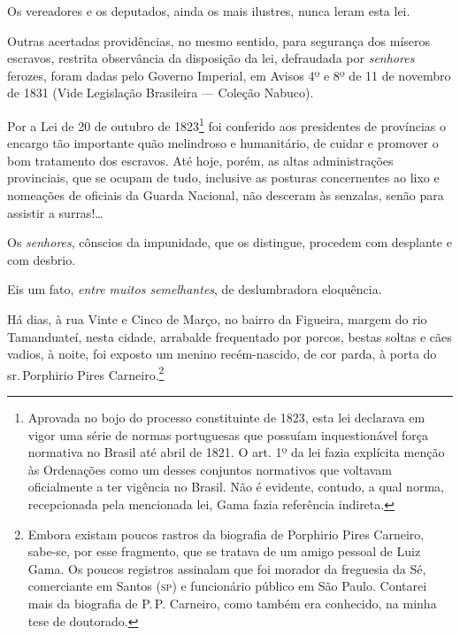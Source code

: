 Os vereadores e os deputados, ainda os mais ilustres, nunca leram esta
lei.

Outras acertadas providências, no mesmo sentido, para segurança dos
míseros escravos, restrita observância da disposição da lei, defraudada
por \emph{senhores} ferozes, foram dadas pelo Governo Imperial, em
Avisos 4º e 8º de 11 de novembro de 1831 (Vide Legislação
Brasileira --- Coleção Nabuco).

Por a Lei de 20 de outubro de 1823\footnote{Aprovada no bojo do
  processo constituinte de 1823, esta lei declarava em vigor uma série
  de normas portuguesas que possuíam inquestionável força normativa no
  Brasil até abril de 1821. O art. 1º da lei fazia explícita menção às
  Ordenações como um desses conjuntos normativos que voltavam
  oficialmente a ter vigência no Brasil. Não é evidente, contudo, a qual
  norma, recepcionada pela mencionada lei, Gama fazia referência indireta.}
foi conferido aos presidentes de províncias o encargo tão importante
quão melindroso e humanitário, de cuidar e promover o bom tratamento dos
escravos. Até hoje, porém, as altas administrações provinciais, que se
ocupam de tudo, inclusive as posturas concernentes ao lixo e nomeações
de oficiais da Guarda Nacional, não desceram às senzalas, senão para
assistir a surras!\ldots{}

Os \emph{senhores}, cônscios da impunidade, que os distingue, procedem
com desplante e com desbrio.

Eis um fato, \emph{entre muitos semelhantes}, de deslumbradora
eloquência.

Há dias, à rua Vinte e Cinco de Março, no bairro da Figueira, margem do
rio Tamanduateí, nesta cidade, arrabalde frequentado por porcos, bestas
soltas e cães vadios, à noite, foi exposto um menino recém-nascido, de
cor parda, à porta do sr.\,Porphirio Pires Carneiro.\footnote{Embora
  existam poucos rastros da biografia de Porphirio Pires Carneiro,
  sabe-se, por esse fragmento, que se tratava de um amigo pessoal de
  Luiz Gama. Os poucos registros assinalam que foi morador da
  freguesia da Sé, comerciante em Santos (\textsc{sp}) e funcionário público em
  São Paulo. Contarei mais da biografia de P.\,P. Carneiro, como também
  era conhecido, na minha tese de doutorado.} %

